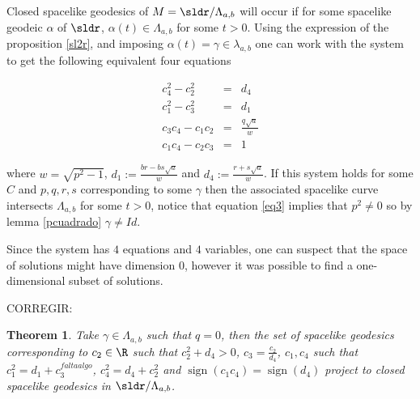 \documentclass[11pt]{amsart}
\DeclareMathOperator{\sign}{sign} %
\theoremstyle{plain}
\newtheorem{thm}{Theorem}[section]
\theoremstyle{definition}
\theoremstyle{remark}
\begin{document}
Closed spacelike geodesics of $M=\sldr/\Lambda_{a,b}$ will occur if for some spacelike geodeic $\alpha$ of $\sldr$, $\alpha(t) \in \Lambda_{a,b}$ for some $t>0$. Using the expression of the proposition \ref{sl2r}, and imposing $\alpha(t)=\gamma \in \lambda_{a,b}$ one can work with the system to get the following equivalent four equations

\begin{eqnarray}
c_4^2-c_2^2&=&d_4 \label{eq2} \\ 
c_1^2-c_3^2&=&d_1 \label{eq1} \\ 
c_3c_4-c_1c_2&=&\frac{q\sqrt{a}}{w} \label{eq3} \\  
c_1c_4-c_2c_3&=&1 \label{eq4}
\end{eqnarray}

where $w=\sqrt{p^2-1}$, $d_1:=\frac{br-bs\sqrt{a}}{w}$ and $d_4:=\frac{r+s\sqrt{a}}{w}$. If this system holds for some $C$ and $p,q,r,s$ corresponding to some $\gamma$ then the associated spacelike curve intersects $\Lambda_{a,b}$ for some $t>0$, notice that equation \ref{eq3} implies that $p^2 \neq 0$ so by lemma \ref{pcuadrado} $\gamma \neq Id$.

Since the system has $4$ equations and $4$ variables, one can suspect that the space of solutions might have dimension $0$, however it was possible to find a one-dimensional subset of solutions.

CORREGIR:

\begin{thm}
Take $\gamma \in \Lambda_{a,b}$ such that $q=0$, then the set of spacelike geodesics corresponding to $c_2 \in \R$ such that $c_2^2+d_4>0$, $c_3=\frac{c_2}{d_4}$, $c_1, c_4$ such that $c_1^2=d_1+c_3^{faltaalgo}$, $c_4^2=d_4+c_2^2$ and $\sign(c_1 c_4)=\sign(d_4)$ project to closed spacelike geodesics in $\sldr / \Lambda_{a,b}$.
\end{thm}
\end{document}
